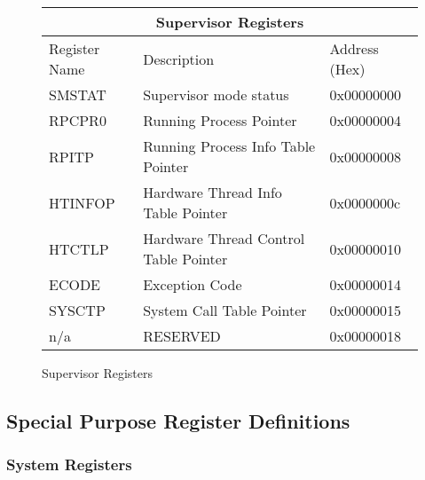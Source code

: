 \documentclass[letterpaper, 11pt]{article}
\begin{document}
\begin{figure} [!h]
	\caption{Supervisor Registers}
	
	\begin{center}
		\fontsize{10}{12}\selectfont
		\begin{tabular}{|l|l|l|}
			\hline
			\multicolumn{3}{|c|}{Supervisor Registers} \\
			\hline
			Register Name 	& Description 								& Address (Hex) \\ \hline
			SMSTAT 			& Supervisor mode status 					& 0x00000000 	\\ \hline
			RPCPR0 			& Running Process Pointer 					& 0x00000004	\\ \hline 
			RPITP			& Running Process Info Table Pointer		& 0x00000008	\\ \hline
			HTINFOP			& Hardware Thread Info Table Pointer		& 0x0000000c 	\\ \hline
			HTCTLP 			& Hardware Thread Control Table Pointer		& 0x00000010 	\\ \hline
			ECODE			& Exception Code							& 0x00000014	\\ \hline
			SYSCTP			& System Call Table Pointer					& 0x00000015	\\ \hline
			n/a				& RESERVED									& 0x00000018	\\ \hline
		\end{tabular}
	\end{center}
	
\end{figure}
\clearpage
\subsection{Special Purpose Register Definitions}

\subsubsection{System Registers}

		
\end{document}
